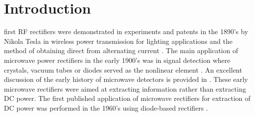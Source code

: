 










\section{Introduction}

 first RF rectifiers were demonstrated in experiments and patents in the 1890's by Nikola Tesla in wireless power transmission for lighting applications and the method of obtaining direct from alternating current \cite{tesla}. The main application of microwave power rectifiers in the early 1900's was in signal detection where crystals, vacuum tubes or diodes served as the nonlinear element \cite{early_rect1,early_rect2}.  An excellent discussion of the early history of microwave detectors is provided in \cite{converter_history}.  These early microwave rectifiers were aimed at extracting information rather than extracting DC power.  The first published application of microwave rectifiers for extraction of DC power was performed in the 1960's using diode-based rectifiers  \cite{purdue_rect,brown_rect1,brown_rect2,nasa_report1}.

